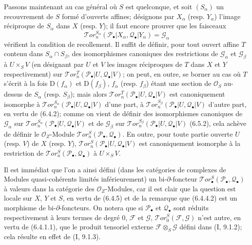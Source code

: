 \begin{env}[6.5.3]
Passons maintenant au cas général où $S$ est quelconque, et soit $(S_\alpha)$
un recouvrement de $S$ formé d'ouverts affines; désignons par $X_\alpha$
(resp. $Y_\alpha$) l'image réciproque de $S_\alpha$ dans $X$ (resp. $Y$); il
faut encore prouver que les faisceaux
\[
  \mathscr{T}\!or_n^{S_\alpha}
  (\mathscr P_\bullet|X_\alpha,\mathscr Q_\bullet|Y_\alpha)
  =\mathscr G_\alpha
\]
vérifient la condition de recollement. Il suffit de définir, pour tout ouvert
affine $T$ contenu dans $S_\alpha\cap S_\beta$, des isomorphismes canoniques des
restrictions de $\mathscr G_\alpha$ et $\mathscr G_\beta$ à $U\times_S V$ (en
désignant par $U$ et $V$ les images réciproques de $T$ dans $X$ et $Y$
respectivement) sur
$\mathscr{T}\!or_n^T(\mathscr P_\bullet|U,\mathscr Q_\bullet|V)$; on peut, en
outre, se borner au cas où $T$ s'écrit à la fois $\mathrm D(f_\alpha)$ et
$\mathrm D(f_\beta)$, $f_\alpha$ (resp. $f_\beta$) étant une section de
$\mathscr O_S$ au-dessus de $S_\alpha$ (resp. $S_\beta$); mais alors
$\mathscr{T}\!or_n^T(\mathscr P_\bullet|U,\mathscr Q_\bullet|V)$ est
canoniquement isomorphe à
$\mathscr{T}\!or_n^{S_\alpha}(\mathscr P_\bullet|U,\mathscr Q_\bullet|V)$
d'une part, à
$\mathscr{T}\!or_n^{S_\beta}(\mathscr P_\bullet|U,\mathscr Q_\bullet|V)$
d'autre part, en vertu de (6.4.2); comme on vient de définir des isomorphismes
canoniques de $\mathscr G_\alpha$ sur
$\mathscr{T}\!or_n^{S_\alpha}(\mathscr P_\bullet|U,\mathscr Q_\bullet|V)$ et
de $\mathscr G_\beta$ sur
$\mathscr{T}\!or_n^{S_\beta}(\mathscr P_\bullet|U,\mathscr Q_\bullet|V)$
(6.5.2), cela achève de définir le $\mathscr O_Z$-Module
$\mathscr{T}\!or_n^S(\mathscr P_\bullet,\mathscr Q_\bullet)$. En outre, pour
toute partie ouverte $U$ (resp. $V$) de $X$ (resp. $Y$),
$\mathscr{T}\!or_n^S(\mathscr P_\bullet|U,\mathscr Q_\bullet|V)$ est
canoniquement isomorphe à la restriction de
$\mathscr{T}\!or_n^S(\mathscr P_\bullet,\mathscr Q_\bullet)$ à $U\times_S V$.

Il est immédiat que l'on a ainsi défini (dans les catégories de complexes de
Modules quasi-cohérents limités inférieurement) un bi-$\partial$-foncteur
$\mathscr{T}\!or_\bullet^S(\mathscr P_\bullet,\mathscr Q_\bullet)$ à valeurs
dans la catégorie des $\mathscr O_Z$-Modules, car il est clair que la question
est locale sur $X$, $Y$ et $S$, en vertu de (6.4.5) et de la remarque que
(6.4.4.2) est un morphisme de bi-$\partial$-foncteurs. On notera que si
$\mathscr P_\bullet$ et $\mathscr Q_\bullet$ sont réduits respectivement à
leurs termes de degré 0, $\mathscr F$ et $\mathscr G$,
$\mathscr{T}\!or_0^S(\mathscr F,\mathscr G)$ n'est autre, en vertu de
(6.4.1.1), que le produit tensoriel externe $\mathscr F\otimes_S\mathscr G$
défini dans (I, 9.1.2); cela résulte en effet de (I, 9.1.3).
\end{env}

